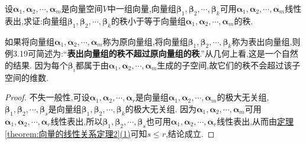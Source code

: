 \documentclass[lang=cn,newtx,10pt,scheme=chinese]{elegantbook}
\begin{document}
\begin{proposition}\label{proposition:表出向量组的秩不超过原向量组的秩}
设\(\boldsymbol{\alpha}_1,\boldsymbol{\alpha}_2,\cdots,\boldsymbol{\alpha}_m\)是向量空间\(V\)中一组向量,向量组\(\boldsymbol{\beta}_1,\boldsymbol{\beta}_2,\cdots,\boldsymbol{\beta}_k\)可用\(\boldsymbol{\alpha}_1,\boldsymbol{\alpha}_2,\cdots,\boldsymbol{\alpha}_m\)线性表出,求证:向量组\(\boldsymbol{\beta}_1,\boldsymbol{\beta}_2,\cdots,\boldsymbol{\beta}_k\)的秩小于等于向量组\(\boldsymbol{\alpha}_1,\boldsymbol{\alpha}_2,\cdots,\boldsymbol{\alpha}_m\)的秩.
\end{proposition}
\begin{remark}
如果将向量组\(\boldsymbol{\alpha}_1,\boldsymbol{\alpha}_2,\cdots,\boldsymbol{\alpha}_m\)称为原向量组,将向量组\(\boldsymbol{\beta}_1,\boldsymbol{\beta}_2,\cdots,\boldsymbol{\beta}_k\)称为表出向量组,则例3.19可简述为:“\textbf{表出向量组的秩不超过原向量组的秩}.”从几何上看,这是一个自然的结果. 因为每个\(\boldsymbol{\beta}_i\)都属于由\(\boldsymbol{\alpha}_1,\boldsymbol{\alpha}_2,\cdots,\boldsymbol{\alpha}_m\)生成的子空间,故它们的秩不会超过该子空间的维数.
\end{remark}
\begin{proof}
不失一般性,可设\(\boldsymbol{\alpha}_1,\boldsymbol{\alpha}_2,\cdots,\boldsymbol{\alpha}_r\)是向量组\(\boldsymbol{\alpha}_1,\boldsymbol{\alpha}_2,\cdots,\boldsymbol{\alpha}_m\)的极大无关组,\(\boldsymbol{\beta}_1,\boldsymbol{\beta}_2,\cdots,\boldsymbol{\beta}_s\)是向量组\(\boldsymbol{\beta}_1,\boldsymbol{\beta}_2,\cdots,\boldsymbol{\beta}_k\)的极大无关组. 因为\(\boldsymbol{\alpha}_1,\boldsymbol{\alpha}_2,\cdots,\boldsymbol{\alpha}_m\)可用\(\boldsymbol{\alpha}_1,\boldsymbol{\alpha}_2,\cdots,\boldsymbol{\alpha}_r\)线性表出,所以\(\boldsymbol{\beta}_1,\boldsymbol{\beta}_2,\cdots,\boldsymbol{\beta}_s\)也可用\(\boldsymbol{\alpha}_1,\boldsymbol{\alpha}_2,\cdots,\boldsymbol{\alpha}_r\)线性表出,从而由\hyperref[theorem:向量的线性关系定理2]{定理\ref{theorem:向量的线性关系定理2}(1)}可知\(s\leq r\),结论成立.
\end{proof}
\end{document}
